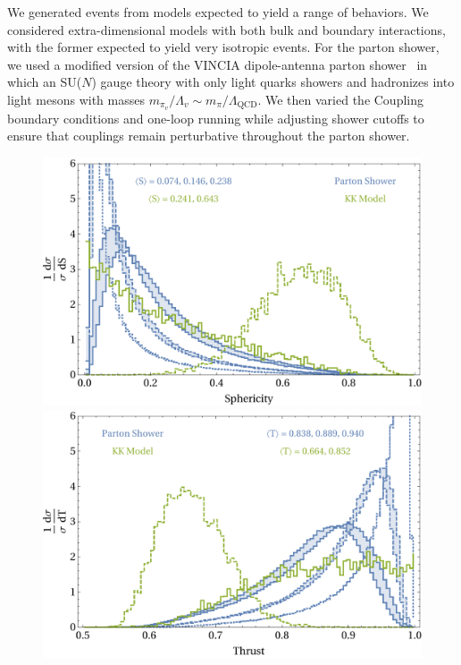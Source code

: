 \begin{enumerate}
We generated events from models expected to yield a range of behaviors. We considered extra-dimensional models with both bulk and boundary interactions, with the former expected to yield very isotropic events. For the parton shower, we used a modified version of the VINCIA dipole-antenna parton shower~\cite{Fischer:2016vfv} in which an SU($N$) gauge theory with only light quarks showers and hadronizes into light mesons with masses $m_{\pi_v}/\Lambda_v \sim m_\pi/\Lambda_\text{QCD}$. We then varied the Coupling boundary conditions and one-loop running while adjusting shower cutoffs to ensure that couplings remain perturbative throughout the parton shower.

\begin{figure}[tb!]
	\centering
	\includegraphics[width=\textwidth]{figures/DS_comparison_sphericity.pdf}\\
	\vspace{1cm}
	\includegraphics[width=\textwidth]{figures/DS_comparison_thrust.pdf}

\end{figure}
\end{enumerate}
